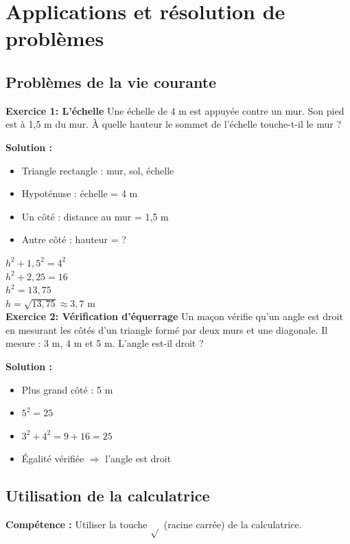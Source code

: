 \section{Applications et résolution de problèmes}

\subsection{Problèmes de la vie courante}

\begin{exercisebox}
\textbf{Exercice 1: L'échelle}
Une échelle de 4 m est appuyée contre un mur. Son pied est à 1,5 m du mur. À quelle hauteur le sommet de l'échelle touche-t-il le mur ?

\textbf{Solution :}
\begin{itemize}
    \item Triangle rectangle : mur, sol, échelle
    \item Hypoténuse : échelle = 4 m
    \item Un côté : distance au mur = 1,5 m
    \item Autre côté : hauteur = ?
\end{itemize}

$h^2 + 1,5^2 = 4^2$\\
$h^2 + 2,25 = 16$\\
$h^2 = 13,75$\\
$h = \sqrt{13,75} \approx 3,7$ m
\\

\textbf{Exercice 2: Vérification d'équerrage}
Un maçon vérifie qu'un angle est droit en mesurant les côtés d'un triangle formé par deux murs et une diagonale. Il mesure : 3 m, 4 m et 5 m. L'angle est-il droit ?

\textbf{Solution :}
\begin{itemize}
	\item Plus grand côté : 5 m
	\item $5^2 = 25$
	\item $3^2 + 4^2 = 9 + 16 = 25$
	\item Égalité vérifiée $\Rightarrow$ l'angle est droit
\end{itemize}
\end{exercisebox}

\subsection{Utilisation de la calculatrice}

\textbf{Compétence :} Utiliser la touche $\sqrt{}$ (racine carrée) de la calculatrice.

